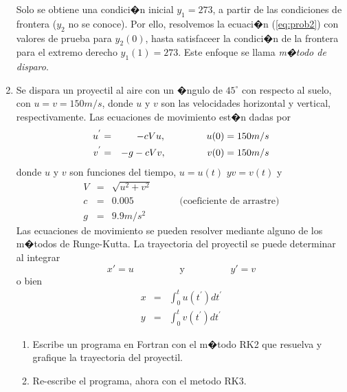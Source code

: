 \documentclass[11pt]{article}
\begin{document}
\begin{enumerate}
Solo se obtiene una condici�n inicial $y_{1}=273$, a partir de las condiciones de frontera ($y_{2}$  no se conoce). Por ello, resolvemos la ecuaci�n (\ref{eq:prob2}) con valores de prueba para $y_{2}(0)$, hasta satisfaceer la condici�n de la frontera para el extremo derecho $y_{1}(1)=273$. Este enfoque se llama \textit{m�todo de disparo}.
\item Se dispara un proyectil al aire con un �ngulo de $45^{\circ}$ con respecto al suelo, con $u=v=150 m/s$, donde $u$ y $v$ son las velocidades horizontal y vertical, respectivamente. Las ecuaciones de movimiento est�n dadas por
\begin{eqnarray*}
u^{'} & = & -c Vu, \hspace{1.5cm} u(0)=150 m/s \\
v^{'} & = & -g - cVv, \hspace{1.5cm} v(0)=150 m/s
\end{eqnarray*}
donde $u$ y $v$ son funciones del tiempo, $u=u(t)$ $y v=v(t)$ y
\begin{eqnarray*}
V & = & \sqrt{u^{2} + v^{2}} \\
c & = & 0.005 \hspace{2cm} \text{(coeficiente de arrastre)} \\
g & = & 9.9 m/s^{2}
\end{eqnarray*}
Las ecuaciones de movimiento se pueden resolver mediante alguno de los m�todos de Runge-Kutta. La trayectoria del proyectil se puede determinar al integrar
\[ x' = u \hspace{2cm} \text{y} \hspace{2cm} y' = v \]
o bien
\begin{eqnarray*}
x & = & \int^{t}_{0} u(t^{'}) dt^{'} \\
y & = & \int^{t}_{0} v(t^{'}) dt^{'}
\end{eqnarray*}
\begin{enumerate}
\item Escribe un programa en Fortran con el m�todo RK2 que resuelva y grafique la trayectoria del proyectil.
\item Re-escribe el programa, ahora con el metodo RK3.
\end{enumerate}
\end{enumerate}
\end{document}
